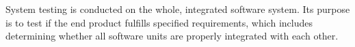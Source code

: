 System testing is conducted on the whole, integrated software system.
Its purpose is to test if the end product fulfills specified
requirements, which includes determining whether all software units are
properly integrated with each other. \cite{wiki:systemtests}
